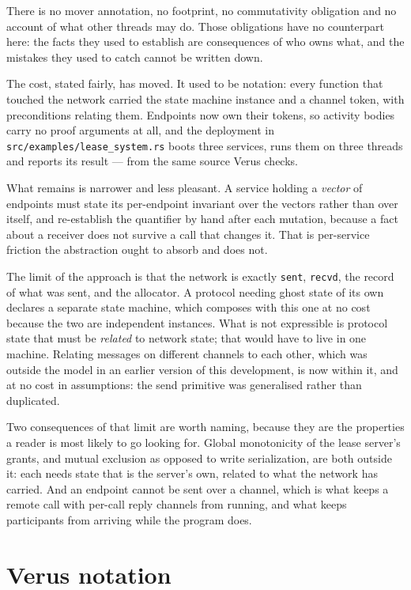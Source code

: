 \documentclass[11pt]{article}
\newcommand{\code}[1]{\texttt{#1}}
\begin{document}
There is no mover annotation, no footprint, no commutativity obligation and no
account of what other threads may do. Those obligations have no counterpart
here: the facts they used to establish are consequences of who owns what, and
the mistakes they used to catch cannot be written down.

The cost, stated fairly, has moved. It used to be notation: every function that
touched the network carried the state machine instance and a channel token,
with preconditions relating them. Endpoints now own their tokens, so activity
bodies carry no proof arguments at all, and the deployment in
\code{src/examples/lease\_system.rs} boots three services, runs them on three
threads and reports its result --- from the same source Verus checks.

What remains is narrower and less pleasant. A service holding a \emph{vector} of
endpoints must state its per-endpoint invariant over the vectors rather than
over itself, and re-establish the quantifier by hand after each mutation,
because a fact about a receiver does not survive a call that changes it. That is
per-service friction the abstraction ought to absorb and does not.

The limit of the approach is that the network is exactly \code{sent},
\code{recvd}, the record of what was sent, and the allocator. A protocol needing
ghost state of its own declares a separate state machine, which composes with
this one at no cost because the two are independent instances. What is not
expressible is protocol state that must be \emph{related} to network state; that
would have to live in one machine. Relating messages on different channels to
each other, which was outside the model in an earlier version of this
development, is now within it, and at no cost in assumptions: the send
primitive was generalised rather than duplicated.

Two consequences of that limit are worth naming, because they are the properties
a reader is most likely to go looking for. Global monotonicity of the lease
server's grants, and mutual exclusion as opposed to write serialization, are
both outside it: each needs state that is the server's own, related to what the
network has carried. And an endpoint cannot be sent over a channel, which is
what keeps a remote call with per-call reply channels from running, and what
keeps participants from arriving while the program does.

\appendix
\section{Verus notation}\label{sec:verus}
\end{document}
